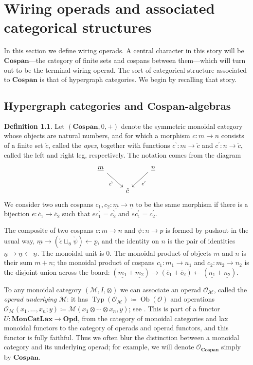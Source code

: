 \documentclass[11pt, article, oneside]{memoir}
\theoremstyle{plain}
\theoremstyle{definition}
\newtheorem{definition}[theorem]{Definition}
\theoremstyle{remark}
\newcommand{\cat}[1]{\mathcal{#1}}
\newcommand{\Cat}[1]{\mathbf{#1}}
\DeclareMathOperator{\Ob}{Ob}
\DeclareMathOperator{\Typ}{Typ}
\newcommand{\from}{\leftarrow}
\newcommand{\ul}[1]{\underline{#1}}
\newcommand{\Cospan}{\Cat{Cospan}}
\newcommand{\OO}{\cat{O}}
\newcommand{\lleg}[1]{#1^\backprime}
\newcommand{\rleg}[1]{#1^\prime}
\newcommand{\apex}[1]{\check{#1}}
\newcommand{\cmap}{c}
\begin{document}
\chapter{Wiring operads and associated categorical structures}

In this section we define wiring operads. A central character in this story will be $\Cospan$---the category of finite sets and cospans between them---which will turn out to be the terminal wiring operad. The sort of categorical structure associated to $\Cospan$ is that of hypergraph categories. We begin by recalling that story.

\section{Hypergraph categories and $\Cospan$-algebras}

\begin{definition}
Let $(\Cospan,0,+)$ denote the symmetric monoidal category whose objects are natural numbers, and for which a morphism $\cmap\colon m\to n$ consists of a finite set $\apex{\cmap}$, called the \emph{apex}, together with functions $\lleg\cmap\colon\ul{m}\to\apex{\cmap}$ and $\rleg\cmap\colon\ul{n}\to\apex{\cmap}$, called the left and right leg, respectively. The notation comes from the diagram
\[
\begin{tikzcd}
	\ul{m}\ar[dr, "\lleg\cmap"']&&\ul{n}\ar[dl, "\rleg\cmap"]\\
	&\apex{\cmap}
\end{tikzcd}
\]
We consider two such cospans $\cmap_1,\cmap_2\colon \ul{m}\to \ul{n}$ to be the same morphism if there is a bijection $e\colon\apex{\cmap_1}\to\apex{\cmap_2}$ such that $e\lleg\cmap_1=\lleg\cmap_2$ and $e\rleg\cmap_1=\rleg\cmap_2$.

The composite of two cospans $\cmap\colon m\to n$ and $\psi\colon n\to p$ is formed by pushout in the usual way, $\ul{m}\to(\apex{\cmap}\sqcup_{\ul{n}}\apex{\psi})\from\ul{p}$, and the identity on $n$ is the pair of identities $\ul{n}\to \ul{n}\from \ul{n}$. The monoidal unit is $0$. The monoidal product of objects $m$ and $n$ is their sum $m+n$; the monoidal product of cospans $\cmap_1\colon m_1\to n_1$ and $\cmap_2\colon m_2\to n_2$ is the disjoint union across the board: $(\ul{m_1}+\ul{m_2})\to(\apex{\cmap_1}+\apex{\cmap_2})\from (\ul{n_1}+\ul{n_2})$.
\end{definition}

To any monoidal category $(\cat{M},I,\otimes)$ we can associate an operad $\OO_\cat{M}$, called the \emph{operad underlying $\cat{M}$}: it has $\Typ(\OO_\cat{M})\coloneqq\Ob(\cat{O})$ and operations $\OO_{\cat{M}}(x_1,\ldots,x_n;y)\coloneqq\cat{M}(x_1\otimes\cdots\otimes x_n,y)$; see \cite{Leinster:2004a}. This is part of a functor $U\colon\Cat{MonCatLax}\to\Cat{Opd}$, from the category of monoidal categories and lax monoidal functors to the category of operads and operad functors, and this functor is fully faithful. Thus we often blur the distinction between a monoidal category and its underlying operad; for example, we will denote $\OO_{\Cospan}$ simply by $\Cospan$.
\end{document}
